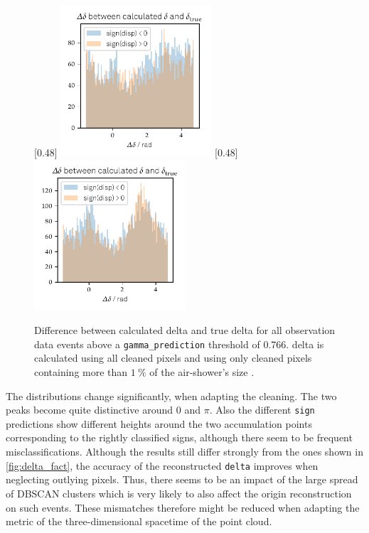 \begin{figure}
  \subcaptionbox{\label{fig:delta_diff_a}}[0.48\textwidth]{
    \includegraphics[width=0.5\textwidth]{Plots/delta_delta/delta_true_diff_hist_thresholds_rad_20131104_162.pdf}
  }
  \subcaptionbox{\label{fig:delta_diff_perc}}[0.48\textwidth]{
    \includegraphics[width=0.5\textwidth]{Plots/delta_delta/delta_delta _DBSCAN_1perc_rad_20131104_162.pdf}
  }
  \caption{Difference between calculated delta and true delta for all observation data events above a \texttt{gamma\_prediction} threshold of \num{0.766}. delta is calculated using all cleaned pixels \protect{} and using only cleaned pixels containing more than $\SI{1}{\percent}$ of the air-shower's size \protect{}.}
  \label{fig:true_delta}
\end{figure}
%
The distributions change significantly, when adapting the cleaning.
The two peaks become quite distinctive around $0$ and $\pi$. Also the
different \texttt{sign} predictions show different heights around the two
accumulation points corresponding to the rightly classified signs, although
there seem to be frequent misclassifications. Although the results still
differ strongly from the ones shown in \autoref{fig:delta_fact}, the
accuracy of the reconstructed \texttt{delta} improves when neglecting outlying pixels. Thus, there
seems to be an impact of the large spread of DBSCAN clusters which is very
likely to also affect the origin reconstruction on such events. These mismatches
therefore might be reduced when adapting the metric of the three-dimensional
spacetime of the point cloud.

